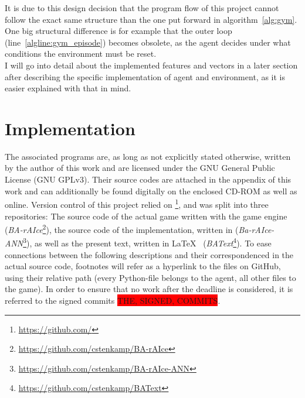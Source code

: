 It is due to this design decision that the program flow of this project cannot follow the exact same structure than the one put forward in algorithm~\ref{alg:gym}. One big structural difference is for example that the outer loop (line~\ref{algline:gym_episode}) becomes obsolete, as the agent decides under what conditions the environment must be reset.\\

\noindent I will go into detail about the implemented features and vectors in a later section after describing the specific implementation of agent and environment, as it is easier explained with that in mind.


\section{Implementation}

The associated programs are, as long as not explicitly stated otherwise, written by the author of this work and are licensed under the GNU General Public License (GNU GPLv3). Their source codes are attached in the appendix of this work and can additionally be found digitally on the enclosed CD-ROM as well as online. Version control of this project relied on \footnote{\url{https://github.com/}}, and was split into three repositories: The source code of the actual game written with the game engine  (\textit{BA-rAIce}\footnote{\url{https://github.com/cstenkamp/BA-rAIce}}), the source code of the implementation, written in  (\textit{Ba-rAIce-ANN}\footnote{\url{https://github.com/cstenkamp/BA-rAIce-ANN}}), as well as the present text, written in \LaTeX ~ (\textit{BAText}\footnote{\url{https://github.com/cstenkamp/BAText}}). To ease connections between the following descriptions and their correspondenced in the actual source code, footnotes will refer as a hyperlink to the files on GitHub, using their relative path (every Python-file belongs to the agent, all other files to the game). In order to ensure that no work after the deadline is considered, it is referred to the signed commits \colorbox{red}{THE, SIGNED, COMMITS}.

